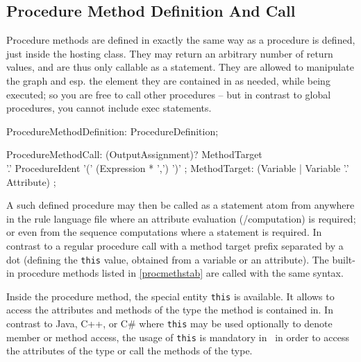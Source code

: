 \subsection{Procedure Method Definition And Call}\label{sub:proceduremethods}\label{sec:procmethcall} 

Procedure methods are defined in exactly the same way as a procedure is defined, just inside the hosting class.
They may return an arbitrary number of return values, and are thus only callable as a statement.
They are allowed to manipulate the graph and esp. the element they are contained in as needed, while being executed;
so you are free to call other procedures -- but in contrast to global procedures, you cannot include exec statements.

\begin{rail} 
  ProcedureMethodDefinition: ProcedureDefinition;
\end{rail}

\begin{rail}
  ProcedureMethodCall: (OutputAssignment)? MethodTarget \\
        '.' ProcedureIdent '(' (Expression * ',') ')' ;
  MethodTarget: (Variable | Variable '.' Attribute) ;
\end{rail}

A such defined procedure may then be called as a statement atom from anywhere in the rule language file where an attribute evaluation (/computation) is required; or even from the sequence computations where a statement is required.
In contrast to a regular procedure call with a method target prefix separated by a dot (defining the \texttt{this} value, obtained from a variable or an attribute).
The built-in procedure methods listed in \ref{procmethstab} are called with the same syntax.

Inside the procedure method, the special entity \texttt{this} is available.
It allows to access the attributes and methods of the type the method is contained in.
In contrast to Java, C++, or C\# where \texttt{this} may be used optionally to denote member or method access,
the usage of \texttt{this} is mandatory in \GrG~in order to access the attributes of the type or call the methods of the type.


